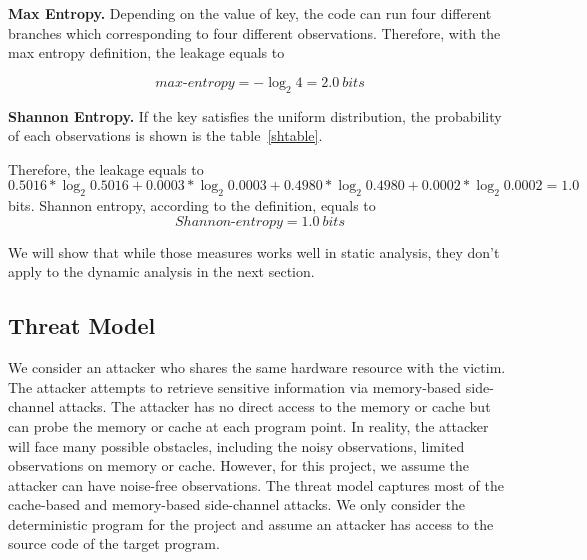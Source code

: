 \textbf{Max Entropy.} 
Depending on the value of key, the code can run four different branches which corresponding to 
four different observations. Therefore, with the max entropy definition, the leakage equals to 

\begin{displaymath}
    \mathit{max\text{-}entropy} = -\log_2{4} = 2.0\ \mathit{bits}
\end{displaymath}

\vspace{3pt}
\textbf{Shannon Entropy.}
If the key satisfies the uniform distribution, the probability of each observations
is shown is the table~\ref{shtable}.  

Therefore, the leakage equals to 
$0.5016*\log_{2}0.5016 + 0.0003*\log_{2}0.0003 + 0.4980*\log_{2}0.4980 + 0.0002*\log_{2}0.0002= 1.0$ bits.
Shannon entropy, according to the definition, equals to 
\begin{displaymath}
    \mathit{Shannon\text{-}entropy} = 1.0\ \mathit{bits}
\end{displaymath}

We will show that while those measures works well in static analysis, 
they don't apply to the dynamic analysis in the next section.

\subsection{Threat Model}
We consider an attacker who shares the same hardware resource with the victim. 
The attacker attempts to retrieve sensitive information via memory-based 
side-channel attacks. 
The attacker has no direct access to the memory or cache but can probe the 
memory or cache at each program point. In reality, the attacker will face 
many possible obstacles,
including the noisy observations, limited observations on memory or cache.
However, for this project, we assume the attacker can have noise-free observations. 
The threat model captures most of the cache-based and memory-based side-channel attacks.
We only consider the deterministic program for the project and assume an attacker has
access to the source code of the target program.
